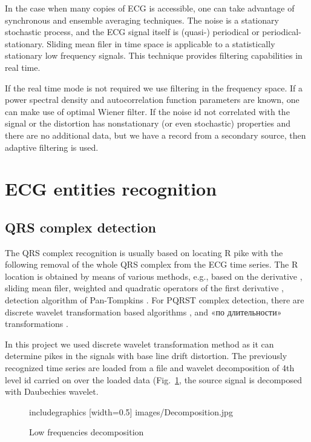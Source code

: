 \documentclass[runningheads]{AIIT}
\newcommand{\nnn}[2][rcolor]{\noindent%
\textcolor{eclr}{}\textcolor{#1}{#2}\textcolor{eclr}{}}
\begin{document}
In the case when many copies of ECG is accessible, one can take advantage of synchronous and ensemble averaging techniques.  The noise is a stationary stochastic process, and the ECG signal itself is (quasi-) periodical or periodical-stationary.  Sliding mean filer in time space is applicable to a statistically stationary low frequency signals.  This technique provides filtering capabilities in real time.

If the real time mode is not required we use filtering in the frequency space.  If a power spectral density and autocorrelation function parameters are known, one can make use of optimal Wiener filter.  If the noise id not correlated with the signal or the distortion has nonstationary (or even stochastic) properties and there are no additional data, but we have a record from a secondary source, then adaptive filtering is used.

\section{ECG entities recognition}
\label{sec:ecg-etit-recogn}

\subsection{QRS complex detection}
\label{sec:qrs-compl-detect}

The QRS complex recognition is usually based on locating R pike with the following removal of the whole QRS complex from the ECG time series.  The R location is obtained by means of various methods, e.g., based on the derivative \cite{2}, sliding mean filer, weighted and quadratic operators of the first derivative \cite{3}, detection algorithm of Pan-Tompkins \cite{4}.  For PQRST complex detection, there are discrete wavelet transformation based algorithms \cite{5,6}, and \nnn{«по длительности»} transformations \cite{7}.

In this project we used discrete wavelet transformation method as it can determine pikes in the signals with base line drift distortion.  The previously recognized time series are loaded from a file and wavelet decomposition of \nnn{4th level} id carried on over the loaded data (Fig.~\ref{fig:decomp}, the source signal is decomposed with Daubechies wavelet.

\begin{figure}[htb]
  \centering
    includegraphics [width=0.5\linewidth] {images/Decomposition.jpg}
  \caption{Low frequencies decomposition}
  \label{fig:decomp}
\end{figure}
\end{document}
